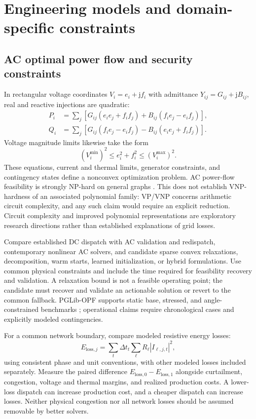 \documentclass[11pt,letterpaper]{article}
\begin{document}
\section{Engineering models and domain-specific constraints}\label{sec:models}
\subsection{AC optimal power flow and security constraints}
In rectangular voltage coordinates $V_i=e_i+\mathrm{j}f_i$ with admittance $Y_{ij}=G_{ij}+\mathrm{j}B_{ij}$, real and reactive injections are quadratic:
\begin{align}
P_i&=\sum_j[G_{ij}(e_ie_j+f_if_j)+B_{ij}(f_ie_j-e_if_j)],\\
Q_i&=\sum_j[G_{ij}(f_ie_j-e_if_j)-B_{ij}(e_ie_j+f_if_j)].
\end{align}
Voltage magnitude limits likewise take the form
\begin{equation}
(V_i^{\min})^2\leq e_i^2+f_i^2\leq(V_i^{\max})^2.
\end{equation}
These equations, current and thermal limits, generator constraints, and contingency states define a nonconvex optimization problem. AC power-flow feasibility is strongly NP-hard on general graphs \cite{hardness}. This does not establish VNP-hardness of an associated polynomial family: VP/VNP concerns arithmetic circuit complexity, and any such claim would require an explicit reduction. Circuit complexity and improved polynomial representations are exploratory research directions rather than established explanations of grid losses.

Compare established DC dispatch with AC validation and redispatch, contemporary nonlinear AC solvers, and candidate sparse convex relaxations, decomposition, warm starts, learned initialization, or hybrid formulations. Use common physical constraints and include the time required for feasibility recovery and validation. A relaxation bound is not a feasible operating point; the candidate must recover and validate an actionable solution or revert to the common fallback. PGLib-OPF supports static base, stressed, and angle-constrained benchmarks \cite{pglib}; operational claims require chronological cases and explicitly modeled contingencies.

For a common network boundary, compare modeled resistive energy losses:
\begin{equation}
E_{\mathrm{loss},j}=\sum_t\Delta t_t\sum_{\ell}R_{\ell}|I_{\ell,j,t}|^2,
\end{equation}
using consistent phase and unit conventions, with other modeled losses included separately. Measure the paired difference $E_{\mathrm{loss},0}-E_{\mathrm{loss},1}$ alongside curtailment, congestion, voltage and thermal margins, and realized production costs. A lower-loss dispatch can increase production cost, and a cheaper dispatch can increase losses. Neither physical congestion nor all network losses should be assumed removable by better solvers.
\end{document}
